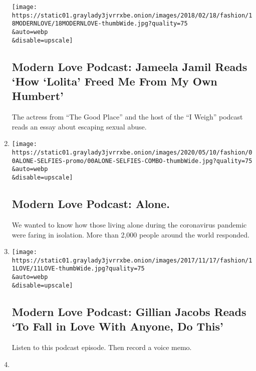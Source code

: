 \begin{enumerate}
  \texttt{[image: https://static01.graylady3jvrrxbe.onion/images/2018/02/18/fashion/18MODERNLOVE/18MODERNLOVE-thumbWide.jpg?quality=75\\\&auto=webp\\\&disable=upscale]}

  \hypertarget{modern-love-podcast-jameela-jamil-reads-how-lolita-freed-me-from-my-own-humbert}{%
  \subsection{Modern Love Podcast: Jameela Jamil Reads `How `Lolita'
  Freed Me From My Own
  Humbert'}\label{modern-love-podcast-jameela-jamil-reads-how-lolita-freed-me-from-my-own-humbert}}

  The actress from ``The Good Place'' and the host of the ``I Weigh''
  podcast reads an essay about escaping sexual abuse.
\item
  \href{/2020/05/13/style/modern-love-podcast-coronavirus-living-alone.html}{}

  \texttt{[image: https://static01.graylady3jvrrxbe.onion/images/2020/05/10/fashion/00ALONE-SELFIES-promo/00ALONE-SELFIES-COMBO-thumbWide.jpg?quality=75\\\&auto=webp\\\&disable=upscale]}

  \hypertarget{modern-love-podcast-alone}{%
  \subsection{Modern Love Podcast:
  Alone.}\label{modern-love-podcast-alone}}

  We wanted to know how those living alone during the coronavirus
  pandemic were faring in isolation. More than 2,000 people around the
  world responded.
\item
  \href{/2020/05/06/style/modern-love-podcast-gillian-jacobs.html}{}

  \texttt{[image: https://static01.graylady3jvrrxbe.onion/images/2017/11/17/fashion/11LOVE/11LOVE-thumbWide.jpg?quality=75\\\&auto=webp\\\&disable=upscale]}

  \hypertarget{modern-love-podcast-gillian-jacobs-reads-to-fall-in-love-with-anyone-do-this}{%
  \subsection{Modern Love Podcast: Gillian Jacobs Reads `To Fall in Love
  With Anyone, Do
  This'}\label{modern-love-podcast-gillian-jacobs-reads-to-fall-in-love-with-anyone-do-this}}

  Listen to this podcast episode. Then record a voice memo.
\item
  \href{/2020/04/29/style/modern-love-podcast-daisy-edgar-jones.html}{}


\end{enumerate}
